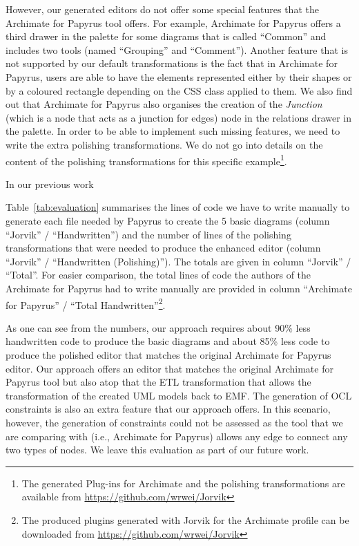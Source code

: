 However, our generated editors do not offer some special features that the Archimate for Papyrus tool offers. 
For example, Archimate for Papyrus offers a third drawer in the palette for some diagrams that is called ``Common'' and includes two tools (named ``Grouping'' and ``Comment''). 
Another feature that is not supported by our default transformations is the fact that in Archimate for Papyrus, users are able to have the elements represented either by their shapes or by a coloured rectangle depending on the CSS class applied to them. 
We also find out that Archimate for Papyrus also organises the creation of the \textit{Junction} (which is a node that acts as a junction for edges) node in the relations drawer in the palette. 
In order to be able to implement such missing features, we need to write the extra polishing transformations. 
We do not go into details on the content of the polishing transformations for this specific example\footnote{The generated Plug-ins for Archimate and the polishing transformations are available from \url{https://github.com/wrwei/Jorvik}}.

In our previous work \cite{zolotas2018towards}

Table~\ref{tab:evaluation} summarises the lines of code we have to write manually to generate each file needed by Papyrus to create the 5 basic diagrams (column ``Jorvik'' / ``Handwritten'') and the number of lines of the polishing transformations that were needed to produce the enhanced editor (column ``Jorvik'' / ``Handwritten (Polishing)''). 
The totals are given in column ``Jorvik'' / ``Total''. 
For easier comparison, the total lines of code the authors of the Archimate for Papyrus had to write manually are provided in column ``Archimate for Papyrus'' / ``Total Handwritten''\footnote{The produced plugins generated with Jorvik for the Archimate profile can be downloaded from \url{https://github.com/wrwei/Jorvik}}.

As one can see from the numbers, our approach requires about 90\% less handwritten code to produce the basic diagrams and about 85\% less code to 
produce the polished editor that matches the original Archimate for Papyrus editor. 
Our approach offers an editor that matches the original Archimate for Papyrus tool but also atop that the ETL transformation that allows the transformation of the created UML models back to EMF. 
The generation of OCL constraints is also an extra feature that our approach offers. 
In this scenario, however, the generation of constraints could not be assessed as the tool that we are comparing with (i.e., Archimate for Papyrus) allows any edge to connect any two types of nodes. We leave this evaluation as part of our future work.

